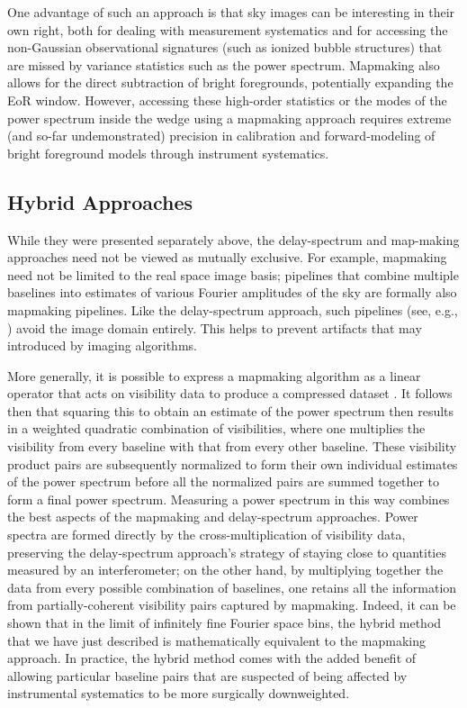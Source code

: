 \documentclass[preprint,11pt]{aastex}
\begin{document}

One advantage of such an approach is that sky images can be interesting in their own right, both for dealing with measurement systematics and for accessing the non-Gaussian observational signatures (such as ionized bubble structures) that are missed by variance statistics such as the power spectrum. Mapmaking also allows for the direct subtraction of bright foregrounds, potentially expanding the EoR window. However, accessing these high-order statistics or the modes of the power spectrum inside the wedge using a mapmaking approach requires extreme (and so-far undemonstrated) precision in calibration and forward-modeling of bright foreground models through instrument systematics. 



\subsection{Hybrid Approaches}
\label{sec:hybridapproach}

While they were presented separately above, the delay-spectrum and map-making approaches need not be viewed as mutually exclusive. For example, mapmaking need not be limited to the real space image basis; pipelines that combine multiple baselines into estimates of various Fourier amplitudes of the sky are formally also mapmaking pipelines. Like the delay-spectrum approach, such pipelines (see, e.g., \citealt{trott_et_al2016}) avoid the image domain entirely. This helps to prevent artifacts that may introduced by imaging algorithms.

More generally, it is possible to express a mapmaking algorithm as a linear operator that acts on visibility data to produce a compressed dataset \citep{dillon_et_al2015a}. It follows then that squaring this to obtain an estimate of the power spectrum then results in a weighted quadratic combination of visibilities, where one multiplies the visibility from every baseline with that from every other baseline. These visibility product pairs are subsequently normalized to form their own individual estimates of the power spectrum before all the normalized pairs are summed together to form a final power spectrum. Measuring a power spectrum in this way combines the best aspects of the mapmaking and delay-spectrum approaches. Power spectra are formed directly by the cross-multiplication of visibility data, preserving the delay-spectrum approach's strategy of staying close to quantities measured by an interferometer; on the other hand, by multiplying together the data from every possible combination of baselines, one retains all the information from partially-coherent visibility pairs captured by mapmaking. Indeed, it can be shown \citep{liu_et_al2014a} that in the limit of infinitely fine Fourier space bins, the hybrid method that we have just described is mathematically equivalent to the mapmaking approach. In practice, the hybrid method comes with the added benefit of allowing particular baseline pairs that are suspected of being affected by instrumental systematics to be more surgically downweighted. 
\end{document}
